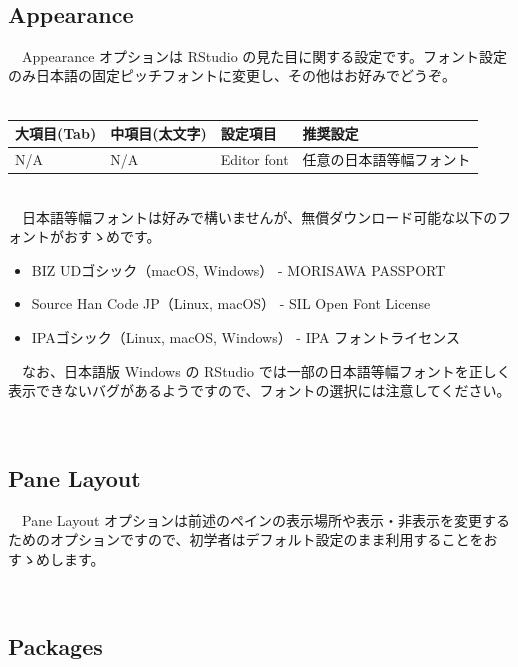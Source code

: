 \documentclass[
  12pt,
]{book}
\providecommand{\tightlist}{%
  \setlength{\itemsep}{0pt}\setlength{\parskip}{0pt}}
\begin{document}
　

\hypertarget{appearance}{%
\subsection{Appearance}\label{appearance}}

　Appearance オプションは RStudio の見た目に関する設定です。フォント設定のみ日本語の固定ピッチフォントに変更し、その他はお好みでどうぞ。\\
　

\begin{longtable}[]{@{}llll@{}}
\toprule
大項目(Tab) & 中項目(太文字) & 設定項目 & 推奨設定 \\
\midrule
\endhead
N/A & N/A & Editor font & 任意の日本語等幅フォント \\
\bottomrule
\end{longtable}

　\\
　日本語等幅フォントは好みで構いませんが、無償ダウンロード可能な以下のフォントがおすゝめです。

\begin{itemize}
\tightlist
\item
  BIZ UDゴシック（macOS, Windows） - MORISAWA PASSPORT
\item
  Source Han Code JP（Linux, macOS） - SIL Open Font License
\item
  IPAゴシック（Linux, macOS, Windows） - IPA フォントライセンス
\end{itemize}

　なお、日本語版 Windows の RStudio では一部の日本語等幅フォントを正しく表示できないバグがあるようですので、フォントの選択には注意してください。

　

\hypertarget{pane-layout}{%
\subsection{Pane Layout}\label{pane-layout}}

　Pane Layout オプションは前述のペインの表示場所や表示・非表示を変更するためのオプションですので、初学者はデフォルト設定のまま利用することをおすゝめします。

　

\hypertarget{packages}{%
\subsection{Packages}\label{packages}}
\end{document}
